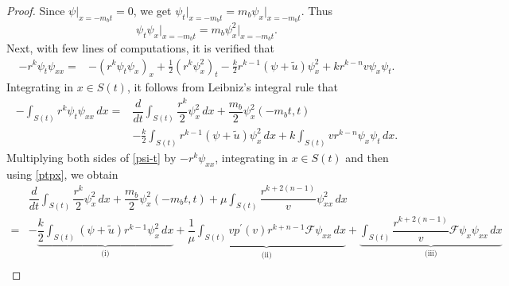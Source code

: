 \documentclass[a4paper,12pt,draft]{article}
\theoremstyle{remark}
\def\ut{\tilde{u}}
\def\mF{\mathcal{F}}
\begin{document}
\begin{proof}
    Since $\psi\vert_{x=-m_b t}=0$, we get $\psi_t\vert_{x=-m_b t} = m_b \psi_x\vert_{x=-m_b t}$. Thus $$\psi_t\psi_x\vert_{x=-m_b t}=m_b \psi_x^2\vert_{x=-m_b t}.$$ Next, with few lines of computations, it is verified that
    \begin{align*}
        -r^k \psi_t \psi_{xx} %
        =& -(r^k\psi_t\psi_x)_x + \frac{1}{2}(r^k\psi_x^2)_t - \frac{k}{2} r^{k-1} (\psi+\ut) \psi_x^2 + k r^{k-n} v \psi_x \psi_t.
    \end{align*}
    Integrating in $x\in S(t)$, it follows from Leibniz's integral rule that
    \begin{align}
        -\int_{S(t)}\!\!\! r^k \psi_t \psi_{xx}\, dx 
        =& \dfrac{d}{dt}\int_{S(t)}\!\!\dfrac{r^k}{2}\psi_x^2 \, dx + \dfrac{m_b}{2} \psi_x^2(-m_bt,t)\nonumber\\ & - \frac{k}{2}\int_{S(t)}\!\! r^{k-1}(\psi+\ut) \psi_x^2\, dx + k\int_{S(t)}\!\! v r^{k-n} \psi_x \psi_t\, dx.\label{ptpx}
    \end{align}
    Multiplying both sides of \eqref{psi-t} by $-r^k \psi_{xx}$, integrating in $x\in S(t)$ and then using \eqref{ptpx}, we obtain
    \begin{align}
        &\dfrac{d}{d t} \int_{S(t)}\!\! \dfrac{r^k}{2} \psi_x^2 \, dx + \dfrac{m_b}{2} \psi_x^2(-m_b t, t) + \mu \int_{S(t)}\!\! \dfrac{r^{k+2(n-1)}}{v} \psi_{xx}^2\, dx\nonumber\\
        =& - \underbrace{\dfrac{k}{2}\int_{S(t)}\!\! (\psi+\ut) r^{k-1} \psi_x^2 \, dx}_{\textrm{(i)}} + \underbrace{\dfrac{1}{\mu} \int_{S(t)}\! v p^{\prime}(v) r^{k+n-1} \mF \psi_{xx}\, dx}_{\textrm{(ii)}} + \underbrace{\int_{S(t)}\!\! \dfrac{r^{k+2(n-1)}}{v} \mF \psi_x \psi_{xx}\, dx}_{\textrm{(iii)}} \nonumber\\

\end{align}
\end{proof}
\end{document}
